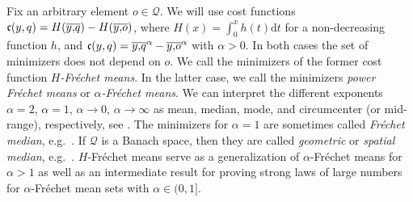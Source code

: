 \documentclass{scrartcl}
\newcommand*{\mc}[1]{\mathcal{#1}}
\newcommand*{\mf}[1]{\mathfrak{#1}}
\newcommand{\dl}{\mathrm{d}}
\theoremstyle{plain}\newtheorem{theorem}{Theorem}[section]
\theoremstyle{definition}
\theoremstyle{remark}
\begin{document}
Fix an arbitrary element $o\in\mc Q$. We will use cost functions $\mf c(y, q) = H(\ol yq)-H(\ol yo)$, where $H(x) = \int_0^x h(t) \dl t$ for a non-decreasing function $h$, and $\mf c(y, q) = \ol yq^\alpha-\ol yo^\alpha$ with $\alpha>0$. In both cases the set of minimizers does not depend on $o$. We call the minimizers of the former cost function \textit{$H$-Fréchet means}. In the latter case, we call the minimizers \textit{power Fréchet means} or \textit{$\alpha$-Fréchet means}. We can interpret the different exponents $\alpha = 2$, $\alpha =1$, $\alpha \to 0$, $\alpha \to \infty$ as mean, median, mode, and circumcenter (or mid-range), respectively, see \cite{macqueen67}. The minimizers for $\alpha=1$ are sometimes called \textit{Fréchet median}, e.g.\ \cite{arnaudon13}. If $\mc Q$ is a Banach space, then they are called \textit{geometric} or \textit{spatial median}, e.g.\ \cite{kemperman87}.
$H$-Fréchet means serve as a generalization of $\alpha$-Fréchet means for $\alpha>1$ as well as an intermediate result for proving strong laws of large numbers for $\alpha$-Fréchet mean sets with $\alpha\in(0,1]$.
\end{document}
